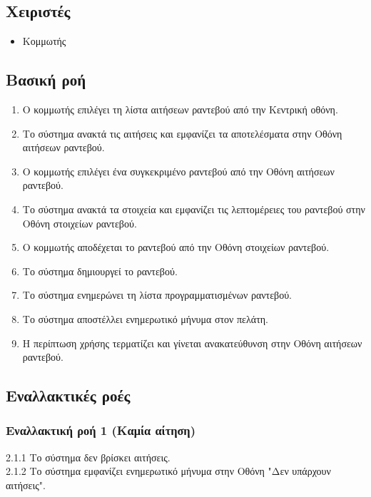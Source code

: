 \documentclass[12pt,a4paper,twoside]{book}
\begin{document}
\subsection{Χειριστές}
\begin{itemize}
    \item Κομμωτής
\end{itemize}

\subsection{Βασική ροή}
\begin{enumerate}
    \item Ο κομμωτής επιλέγει τη λίστα αιτήσεων ραντεβού από την Κεντρική οθόνη.
    \item Το σύστημα ανακτά τις αιτήσεις και εμφανίζει τα αποτελέσματα στην Οθόνη αιτήσεων ραντεβού.
    \item Ο κομμωτής επιλέγει ένα συγκεκριμένο ραντεβού από την Οθόνη αιτήσεων ραντεβού.
    \item Το σύστημα ανακτά τα στοιχεία και εμφανίζει τις λεπτομέρειες του ραντεβού στην Οθόνη στοιχείων ραντεβού.
    \item Ο κομμωτής αποδέχεται το ραντεβού από την Οθόνη στοιχείων ραντεβού.
    \item Το σύστημα δημιουργεί το ραντεβού.
    \item Το σύστημα ενημερώνει τη λίστα προγραμματισμένων ραντεβού.
    \item Το σύστημα αποστέλλει ενημερωτικό μήνυμα στον πελάτη.
    \item Η περίπτωση χρήσης τερματίζει και γίνεται ανακατεύθυνση στην Οθόνη αιτήσεων ραντεβού.
\end{enumerate}

\subsection{Εναλλακτικές ροές}

\subsubsection*{Εναλλακτική ροή 1 (Καμία αίτηση)}
2.1.1 Το σύστημα δεν βρίσκει αιτήσεις.\\
\hspace*{\parindent}2.1.2 Το σύστημα εμφανίζει ενημερωτικό μήνυμα στην Οθόνη "Δεν υπάρχουν αιτήσεις".
\end{document}
